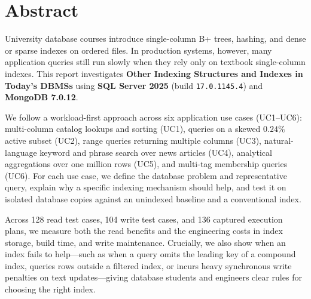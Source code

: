 \chapter*{Abstract}
University database courses introduce single-column B+ trees, hashing, and dense or sparse indexes on ordered files. In production systems, however, many application queries still run slowly when they rely only on textbook single-column indexes. This report investigates \textbf{Other Indexing Structures and Indexes in Today's DBMSs} using \textbf{SQL Server 2025} (build \texttt{17.0.1145.4}) and \textbf{MongoDB 7.0.12}.

We follow a workload-first approach across six application use cases (UC1--UC6): multi-column catalog lookups and sorting (UC1), queries on a skewed $0.24\%$ active subset (UC2), range queries returning multiple columns (UC3), natural-language keyword and phrase search over news articles (UC4), analytical aggregations over one million rows (UC5), and multi-tag membership queries (UC6). For each use case, we define the database problem and representative query, explain why a specific indexing mechanism should help, and test it on isolated database copies against an unindexed baseline and a conventional index.

Across 128 read test cases, 104 write test cases, and 136 captured execution plans, we measure both the read benefits and the engineering costs in index storage, build time, and write maintenance. Crucially, we also show when an index fails to help---such as when a query omits the leading key of a compound index, queries rows outside a filtered index, or incurs heavy synchronous write penalties on text updates---giving database students and engineers clear rules for choosing the right index.
\clearpage
